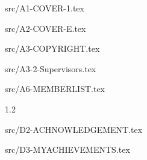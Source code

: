 \documentclass[12pt,openany,a4paper,fancyhdr,twoside]{ctexbook}
\newcommand{\loflabel}{图}%
\newcommand{\lotlabel}{表}
\newcommand{\PrintVersion}[1]{}
\begin{document}
 {src/A1-COVER-1.tex}
\PrintVersion{
	\clearpage
	\phantom{s}
	\clearpage
}
 {src/A2-COVER-E.tex}
\PrintVersion{
	\clearpage
	\phantom{s}
	\clearpage
}
 {src/A3-COPYRIGHT.tex}
\PrintVersion{
	\clearpage
	\phantom{s}
	\clearpage
}
 {src/A3-2-Supervisors.tex}
\PrintVersion{
	\clearpage
	\phantom{s}
	\clearpage
}

 {src/A6-MEMBERLIST.tex}
\PrintVersion{
	\clearpage
	\phantom{s}
	\clearpage
}

\newpage
{}
\pagestyle{plain}


\clearpage
\phantom{s}
\clearpage



\setcounter{secnumdepth}{3}

\setcounter{tocdepth}{2}
\tableofcontents


\clearpage
\phantom{s}
\clearpage

\renewcommand{\numberline}[1]
{\loflabel~#1\hspace*{1em}}%
\listoffigures%

\renewcommand{\numberline}[1]{\lotlabel~#1\hspace*{1em}}
\listoftables
\clearpage
\phantom{s}
\clearpage



\newpage
{}
\pagestyle{plain}


\setlength{\baselineskip}{25pt}  %








% 
\clearpage
\phantom{s}
\clearpage





\begin{spacing}{1.2}


\end{spacing}

\pagestyle{plain}\clearpage
\pagestyle{plain}
\clearpage
\pagestyle{plain}
\clearpage
\clearpage
\phantom{s}
\clearpage

 {src/D2-ACHNOWLEDGEMENT.tex}


\pagestyle{plain}
\clearpage 
{}
{}
 {src/D3-MYACHIEVEMENTS.tex}

\printindex
\end{document}
